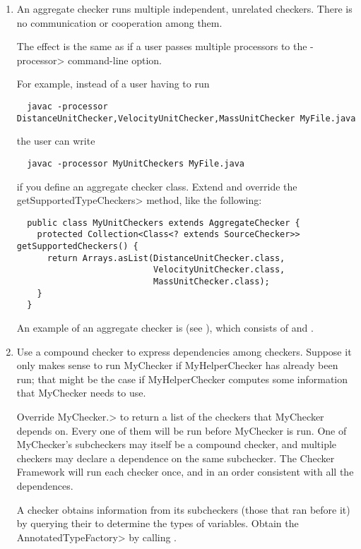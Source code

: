 \begin{enumerate}
\item
An aggregate checker runs multiple independent, unrelated checkers.  There
is no communication or cooperation among them.

The effect is the same as if a user passes
multiple processors to the \<-processor> command-line option.

For example, instead of a user having to run

\begin{Verbatim}
  javac -processor DistanceUnitChecker,VelocityUnitChecker,MassUnitChecker MyFile.java
\end{Verbatim}

\noindent
the user can write

\begin{Verbatim}
  javac -processor MyUnitCheckers MyFile.java
\end{Verbatim}

\noindent
if you define an aggregate checker class.  Extend  and override
the \<getSupportedTypeCheckers> method, like the following:

\begin{Verbatim}
  public class MyUnitCheckers extends AggregateChecker {
    protected Collection<Class<? extends SourceChecker>> getSupportedCheckers() {
      return Arrays.asList(DistanceUnitChecker.class,
                           VelocityUnitChecker.class,
                           MassUnitChecker.class);
    }
  }
\end{Verbatim}

An example of an aggregate checker is 
(see ), which consists of
 and
.

\item
Use a compound checker to express dependencies among checkers.  Suppose it
only makes sense to run MyChecker if MyHelperChecker has already been run;
that might be the case if MyHelperChecker computes some information that
MyChecker needs to use.

Override
\<MyChecker.>
to return a list of the checkers that MyChecker depends on.  Every one of
them will be run before MyChecker is run.  One of MyChecker's subcheckers
may itself be a compound checker, and multiple checkers may declare a
dependence on the same subchecker.  The Checker Framework will run each
checker once, and in an order consistent with all the dependences.

A checker obtains information from its subcheckers (those that ran before
it) by querying their  to
determine the types of variables.  Obtain the \<AnnotatedTypeFactory> by
calling
.

\end{enumerate}



